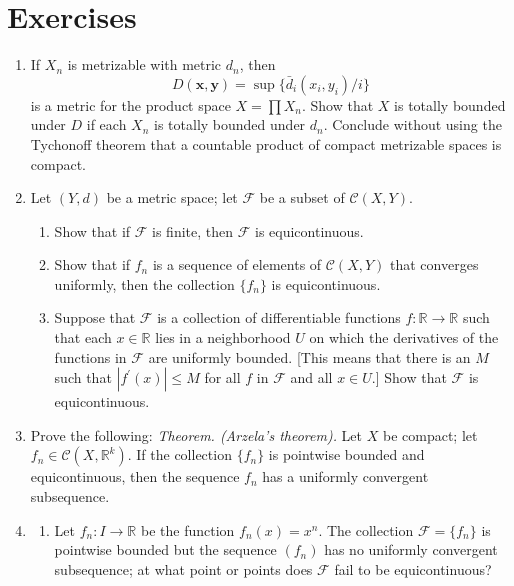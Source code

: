 \section*{Exercises}
\begin{enumerate}[itemsep=0.4em, parsep=0pt, topsep=0pt, partopsep=0pt, leftmargin=*, label=\arabic*., ref=\arabic*]
\item If \(X_{n}\) is metrizable with metric \(d_{n}\), then \[ D({\mathbf{x},\mathbf{y}}) = \sup \{ {\bar{d}_{i}({x_{i},y_{i}}) /i}\} \] is a metric for the product space \(X = \prod {X}_{n}\). Show that \(X\) is totally bounded under \(D\) if each \(X_{n}\) is totally bounded under \(d_{n}\). Conclude without using the Tychonoff theorem that a countable product of compact metrizable spaces is compact.
\item Let \((Y, d)\) be a metric space; let \(\mathcal{F}\) be a subset of \(\mathcal{C}({X,Y})\).
 \begin{enumerate}[itemsep=0.2em, parsep=0pt, topsep=0pt, partopsep=0pt, leftmargin=*, label=(\alph*), align=left]
 \item Show that if \(\mathcal{F}\) is finite, then \(\mathcal{F}\) is equicontinuous.
 \item Show that if \(f_{n}\) is a sequence of elements of \(\mathcal{C}({X,Y})\) that converges uniformly, then the collection \(\{ f_{n}\}\) is equicontinuous.
 \item Suppose that \(\mathcal{F}\) is a collection of differentiable functions \(f : \mathbb{R} \rightarrow \mathbb{R}\) such that each \(x \in \mathbb{R}\) lies in a neighborhood \(U\) on which the derivatives of the functions in \(\mathcal{F}\) are uniformly bounded. [This means that there is an \(M\) such that \(| {f^{\prime }(x) }| \leq M\) for all \(f\) in \(\mathcal{F}\) and all \(x \in U\).] Show that \(\mathcal{F}\) is equicontinuous.
 \end{enumerate}
\item Prove the following: \textsl{Theorem. (Arzela's theorem).} Let \(X\) be compact; let \(f_{n} \in \mathcal{C}({X,\mathbb{R}^{k}})\). If the collection \(\{ f_{n}\}\) is pointwise bounded and equicontinuous, then the sequence \(f_{n}\) has a uniformly convergent subsequence. 
\item
 \begin{enumerate}[itemsep=0.2em, parsep=0pt, topsep=0pt, partopsep=0pt, leftmargin=*, label=(\alph*), align=left]
 \item Let \(f_{n} : I \rightarrow \mathbb{R}\) be the function \(f_{n}(x) = x^{n}\). The collection \(\mathcal{F} = \{ f_{n}\}\) is pointwise bounded but the sequence \((f_{n})\) has no uniformly convergent subsequence; at what point or points does \(\mathcal{F}\) fail to be equicontinuous?


\end{enumerate}
\end{enumerate}
